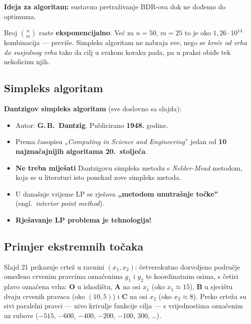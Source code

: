 \textbf{Ideja za algoritam:} sustavno pretraživanje BDR-ova dok ne dođemo do
optimuma.

\begin{napomena}
Broj $\binom{n}{m}$ raste \textbf{eksponencijalno}. Već za $n = 50$, $m = 25$
to je oko $1{,}26\cdot10^{14}$ kombinacija --- previše. Simpleks algoritam ne
nabraja sve, nego se \emph{kreće od vrha do susjednog vrha} tako da cilj u
svakom koraku pada, pa u praksi obiđe tek nekolicinu njih.
\end{napomena}

\subsection{Simpleks algoritam}

\textbf{Dantzigov simpleks algoritam} (sve doslovno sa slajda):

\begin{itemize}
  \item Autor: \textbf{G.\,B.\ Dantzig}. Publicirano \textbf{1948.} godine.
  \item Prema časopisu „\emph{Computing in Science and Engineering}” jedan od
        \textbf{10 najznačajnijih algoritama 20.\ stoljeća}.
  \item \textbf{Ne treba miješati} Dantzigovu simpleks metodu s
        \emph{Nelder-Mead} metodom, koja se u literaturi isto ponekad zove
        simpleks metoda.
  \item U današnje vrijeme LP se rješava \textbf{„metodom unutrašnje točke”}
        (engl.\ \emph{interior point method}).
  \item \textbf{Rješavanje LP problema je tehnologija!}
\end{itemize}

\subsection{Primjer ekstremnih točaka}

Slajd 21 prikazuje crtež u ravnini $(x_1, x_2)$: četverokutno dozvoljeno
područje omeđeno crvenim pravcima označenima $g_1$ i $g_2$ te koordinatnim
osima, s četiri plavo označena vrha: \textbf{O} u ishodištu, \textbf{A} na osi
$x_1$ (oko $x_1 \approx 15$), \textbf{B} u sjecištu dvaju crvenih pravaca (oko
$(10,5)$) i \textbf{C} na osi $x_2$ (oko $x_2 \approx 8$). Preko crteža su
sivi paralelni pravci --- nivo krivulje funkcije cilja --- s vrijednostima
označenim uz rubove ($-515$, $-600$, $-400$, $-200$, $-100$, $300$, \dots).

